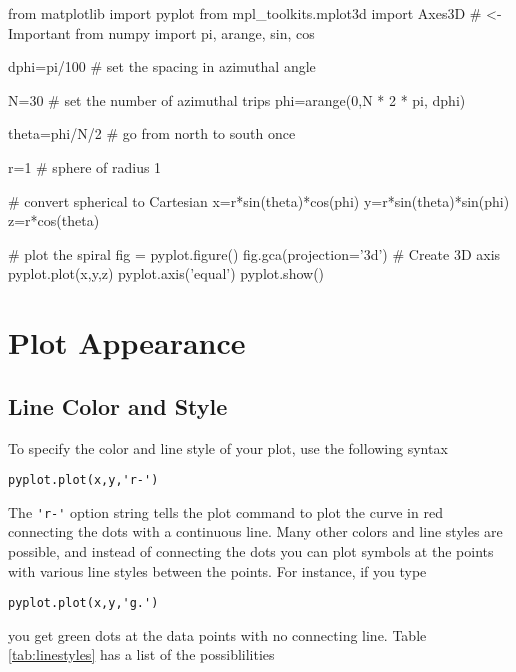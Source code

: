 \begin{codeexample}
\begin{VerbatimOut}{\listingFile}
from matplotlib import pyplot
from mpl_toolkits.mplot3d import Axes3D  # <- Important
from numpy import pi, arange, sin, cos

dphi=pi/100 # set the spacing in azimuthal angle

N=30 # set the number of azimuthal trips
phi=arange(0,N * 2 * pi, dphi)

theta=phi/N/2 # go from north to south once

r=1  # sphere of radius 1

# convert spherical to Cartesian
x=r*sin(theta)*cos(phi)
y=r*sin(theta)*sin(phi)
z=r*cos(theta)

# plot the spiral
fig = pyplot.figure()
fig.gca(projection='3d')  # Create 3D axis
pyplot.plot(x,y,z)
pyplot.axis('equal')
pyplot.show()
\end{VerbatimOut}
\end{codeexample}

\section{Plot Appearance}

\subsection*{Line Color and Style}

To specify the color and line style of your plot, use the following syntax
\begin{Verbatim}
pyplot.plot(x,y,'r-')
\end{Verbatim}
The \verb|'r-'| option string tells the plot command to plot the
curve in red connecting the dots with a continuous line. Many other
colors and line styles are possible, and instead of connecting the
dots you can plot symbols at the points with various line styles
between the points. For instance, if you type
\begin{Verbatim}
pyplot.plot(x,y,'g.')
\end{Verbatim}
you get green dots at the data points with no connecting line.  Table
\ref{tab:linestyles} has a list of the possiblilities


